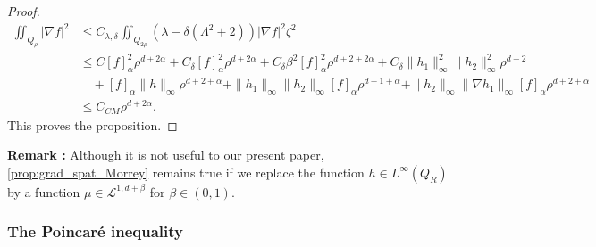 \documentclass[reqno,12pt,twoside]{amsart}
\numberwithin{equation}{section} \numberwithin{theorem}{section}
\numberwithin{proposition}{section} \numberwithin{lemma}{section}
\numberwithin{corollary}{section}
\numberwithin{definition}{section} \numberwithin{remark}{section}
\begin{document}
\begin{proof}
\begin{align*}
\iint_{Q_{\rho}} |\nabla f|^2 &\leqslant C_{\lambda, \delta} \iint_{Q_{2\rho}} (\lambda -\delta (\Lambda^2+2)) |\nabla f|^2 \zeta^2 \\
&\leqslant C[f]_\alpha^2 \rho^{d+2\alpha} + C_{\delta} [f]_\alpha^2 \rho^{d+2\alpha} + C_\delta \beta^2[f]_\alpha^2\rho^{d+2+2\alpha} + C_\delta \|h_1\|_\infty^2 \|h_2\|_\infty^2 \rho^{d+2}\\
&\quad  + [f]_\alpha \|h\|_{\infty} \rho^{d+2+\alpha} +  \|h_1\|_\infty \|h_2\|_\infty [f]_\alpha \rho^{d+1+\alpha} + \|h_2\|_\infty \|\nabla h_1\|_\infty [f]_\alpha \rho^{d+2+\alpha}\\
&\leqslant C_{CM} \rho^{d+2\alpha}.
\end{align*}
This proves the proposition. 
\end{proof}

\textbf{Remark :} Although it is not useful to our present paper, \autoref{prop:grad_spat_Morrey} remains true if we replace the function $h\in L^\infty(Q_R)$ by a function $\mu \in \mathcal{L}^{1,d+\beta}$ for $\beta \in (0,1)$. 

\subsubsection{The Poincaré inequality}
\end{document}
